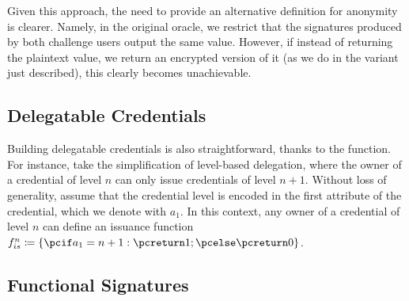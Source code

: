 Given this approach, the need to provide an alternative definition for anonymity
is clearer. Namely, in the original \CHALb oracle, we restrict that the
signatures produced by both challenge users output the same \yeval value.
However, if instead of returning the plaintext \yeval value, we return an
encrypted version of it (as we do in the variant just described), this clearly
becomes unachievable.


\subsection{Delegatable Credentials}

Building delegatable credentials is also straightforward, thanks to the \fissue
function. For instance, take the simplification of level-based delegation, where
the owner of a credential of level $n$ can only issue credentials of level
$n+1$. Without loss of generality, assume that the credential level is encoded
in the first attribute of the credential, which we denote with $a_1$. In this
context, any owner of a credential of level $n$ can define an issuance function
$\fissue^n \coloneqq \lbrace \pcif a_1 = n+1: \pcreturn 1; \pcelse \pcreturn 0
\rbrace$.

\subsection{Functional Signatures}


